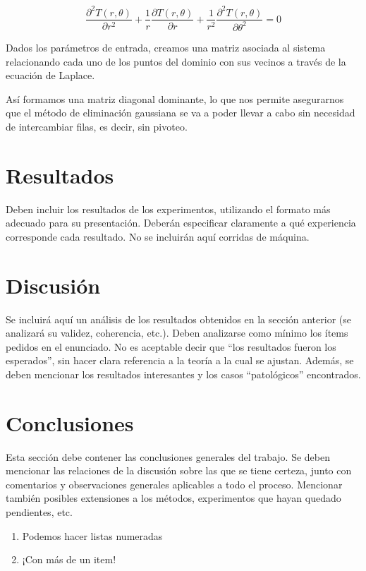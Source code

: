 \documentclass[11pt, a4paper, spanish]{article}
\begin{document}
  \[ \frac{\partial^2 T(r, \theta)}{\partial r^2} + \frac{1}{r} \frac{\partial T(r, \theta)}{\partial r} + \frac{1}{r^2} \frac{\partial^2 T(r, \theta)}{\partial \theta^2} = 0 \]

  Dados los parámetros de entrada, creamos una matriz asociada al sistema relacionando cada uno de los puntos del dominio con sus vecinos a través de la ecuación de Laplace.

  Así formamos una matriz diagonal dominante, lo que nos permite asegurarnos que el método de eliminación gaussiana se va a poder llevar a cabo sin necesidad de intercambiar filas, es decir, sin pivoteo.

\section{Resultados}

  Deben incluir los resultados de los experimentos, utilizando el formato más adecuado para su presentación. Deberán especificar claramente a qué experiencia corresponde cada resultado. No se incluirán aquí corridas de máquina.

\section{Discusión}

  Se incluirá aquí un análisis de los resultados obtenidos en la sección anterior (se analizará su validez, coherencia, etc.). Deben analizarse como mínimo los ítems pedidos en el enunciado. No es aceptable decir que ``los resultados fueron los esperados'', sin hacer clara referencia a la teoría a la cual se ajustan. Además, se deben mencionar los resultados interesantes y los casos ``patológicos'' encontrados.

\section{Conclusiones}

  Esta sección debe contener las conclusiones generales del trabajo. Se deben mencionar las relaciones de la discusión sobre las que se tiene certeza, junto con comentarios y observaciones generales aplicables a todo el proceso. Mencionar también posibles extensiones a los métodos, experimentos que hayan quedado pendientes, etc.

  \begin{enumerate}
    \item Podemos hacer listas numeradas
    \item ¡Con más de un item!
  \end{enumerate}
\end{document}
